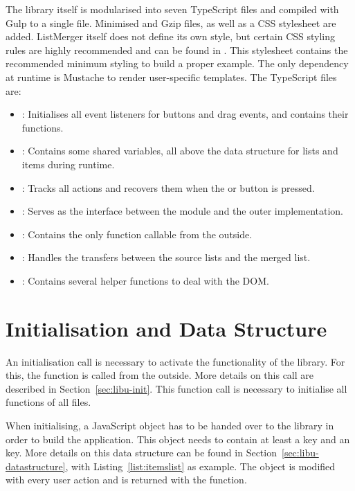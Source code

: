 The library itself is modularised into seven TypeScript files and
compiled with Gulp to a single  file. Minimised and Gzip
files, as well as a CSS stylesheet are added. ListMerger itself does not
define its own style, but certain CSS styling rules are highly
recommended and can be found in . This stylesheet
contains the recommended minimum styling to build a proper example. The
only dependency at runtime is Mustache \parencite{mustache} to render
user-specific templates. The TypeScript files are:
\begin{itemize}
\item {}: Initialises all event listeners for buttons and
drag events, and contains their functions.

\item {}: Contains some shared variables, all above
the data structure for lists and items during runtime.

\item {}: Tracks all actions and recovers them when the
 or  button is pressed.

\item {}: Serves as the interface between the module
and the outer implementation.

\item {}: Contains the only function callable from the
outside.

\item {}: Handles the transfers between the source
lists and the merged list.

\item {}: Contains several helper functions to deal
with the DOM.
\end{itemize}




\section{Initialisation and Data Structure}

An initialisation call is necessary to activate the functionality of the
library. For this, the function  is called from the
outside. More details on this call are described in
Section~\ref{sec:libu-init}. This function call is necessary to
initialise all functions of all files.

When initialising, a JavaScript object has to be handed over to the
library in order to build the application. This object needs to contain
at least a  key and an  key. More
details on this data structure can be found in
Section~\ref{sec:libu-datastructure}, with Listing~\ref{list:itemslist}
as example. The object is modified with every user action and is
returned with the  function.




